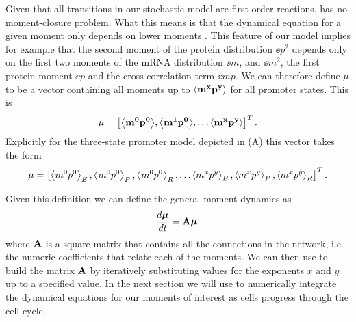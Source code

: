 Given that all transitions in our stochastic model are first order reactions,
 has no moment-closure problem. What this means is that the
dynamical equation for a given moment only depends on lower moments . This feature of our model implies for example that
the second moment of the protein distribution $\ee{p^2}$ depends only on the
first two moments of the mRNA distribution $\ee{m}$, and $\ee{m^2}$, the first
protein moment $\ee{p}$  and the cross-correlation term $\ee{mp}$. We can
therefore define $\mathbf{\mu}$ to be a vector containing all moments up to
$\mathbf{\left\langle m^x p^y \right\rangle}$ for all promoter states. This is
\begin{equation}
\mathbf{\mu} = \left[ \mathbf{\left\langle m^0 p^0 \right\rangle},
								  \mathbf{\left\langle m^1 p^0 \right\rangle},
									\ldots \mathbf{\left\langle m^x p^y \right\rangle} \right]^T.
\end{equation}
Explicitly for the three-state promoter model depicted in
(A) this vector takes the form
\begin{equation}
	\mathbf{\mu} = \left[ \left\langle m^0 p^0 \right\rangle_E, \left\langle m^0 p^0 \right\rangle_P, \left\langle m^0 p^0 \right\rangle_R, \ldots
                 \left\langle m^x p^y \right\rangle_E, \left\langle m^x p^y \right\rangle_P, \left\langle m^x p^y \right\rangle_R \right]^T.
\end{equation}

Given this definition we can define the general moment dynamics as
\begin{equation}
{d{\boldsymbol{\mu}} \over dt} = \mathbf{A} \boldsymbol{\mu},
\label{eq_mom_dynamics}
\end{equation}
where $\mathbf{A}$ is a square matrix that contains all the connections in the
network, i.e. the numeric coefficients that relate each of the moments. We can
then use  to build the matrix $\mathbf{A}$ by iteratively
substituting values for the exponents $x$ and $y$ up to a specified value. In
the next section we will use  to numerically integrate the
dynamical equations for our moments of interest as cells progress through the
cell cycle.
